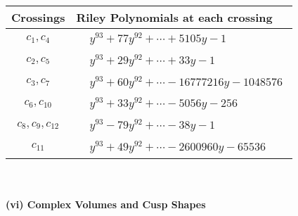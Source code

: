 \documentclass[1p]{elsarticle_modified}
\theoremstyle{definition}
\begin{document}
\begin{tabular}{m{50pt}|m{274pt}}
Crossings & \hspace{64pt}Riley Polynomials at each crossing \\
\hline $$\begin{aligned}c_{1},c_{4}\end{aligned}$$&$\begin{aligned}
&y^{93}+77 y^{92}+\cdots+5105 y-1
\end{aligned}$\\
\hline $$\begin{aligned}c_{2},c_{5}\end{aligned}$$&$\begin{aligned}
&y^{93}+29 y^{92}+\cdots+33 y-1
\end{aligned}$\\
\hline $$\begin{aligned}c_{3},c_{7}\end{aligned}$$&$\begin{aligned}
&y^{93}+60 y^{92}+\cdots-16777216 y-1048576
\end{aligned}$\\
\hline $$\begin{aligned}c_{6},c_{10}\end{aligned}$$&$\begin{aligned}
&y^{93}+33 y^{92}+\cdots-5056 y-256
\end{aligned}$\\
\hline $$\begin{aligned}c_{8},c_{9},c_{12}\end{aligned}$$&$\begin{aligned}
&y^{93}-79 y^{92}+\cdots-38 y-1
\end{aligned}$\\
\hline $$\begin{aligned}c_{11}\end{aligned}$$&$\begin{aligned}
&y^{93}+49 y^{92}+\cdots-2600960 y-65536
\end{aligned}$\\
\hline
\end{tabular}\\~\\
\newpage\flushleft \textbf{(vi) Complex Volumes and Cusp Shapes}
\end{document}
